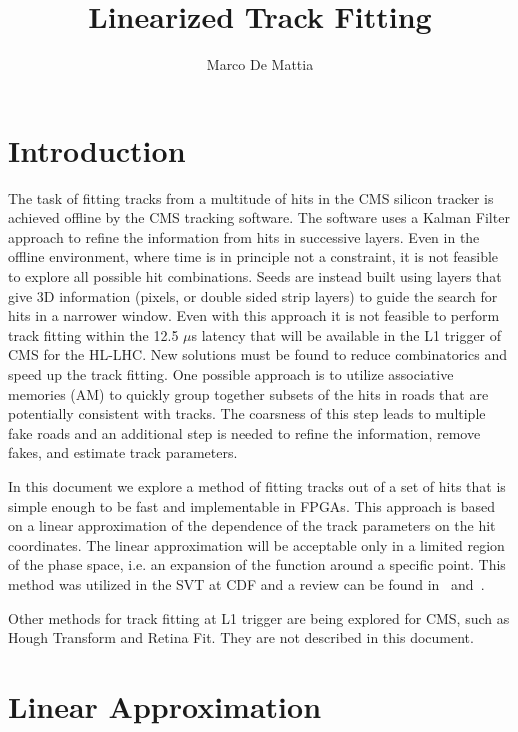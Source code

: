 \documentclass[10pt,a4paper]{article}
\begin{document}
\author{Marco De Mattia}
\title{Linearized Track Fitting}
\maketitle

\section{Introduction}

The task of fitting tracks from a multitude of hits in the CMS silicon tracker is achieved offline by the CMS tracking software. The software uses a Kalman Filter approach to refine the information from hits in successive layers. Even in the offline environment, where time is in principle not a constraint, it is not feasible to explore all possible hit combinations. Seeds are instead built using layers that give 3D information (pixels, or double sided strip layers) to guide the search for hits in a narrower window. Even with this approach it is not feasible to perform track fitting within the 12.5 $\mu$s latency that will be available in the L1 trigger of CMS for the HL-LHC. New solutions must be found to reduce combinatorics and speed up the track fitting. One possible approach is to utilize associative memories (AM) to quickly group together subsets of the hits in roads that are potentially consistent with tracks. The coarsness of this step leads to multiple fake roads and an additional step is needed to refine the information, remove fakes, and estimate track parameters.

In this document we explore a method of fitting tracks out of a set of hits that is simple enough to be fast and implementable in FPGAs. This approach is based on a linear approximation of the dependence of the track parameters on the hit coordinates. The linear approximation will be acceptable only in a limited region of the phase space, i.e. an expansion of the function around a specific point. This method was utilized in the SVT at CDF and a review can be found in~\cite{SVTReview} and~\cite{SVTReviewFermilab}.

Other methods for track fitting at L1 trigger are being explored for CMS, such as Hough Transform and Retina Fit. They are not described in this document.

\section{Linear Approximation}
\end{document}
